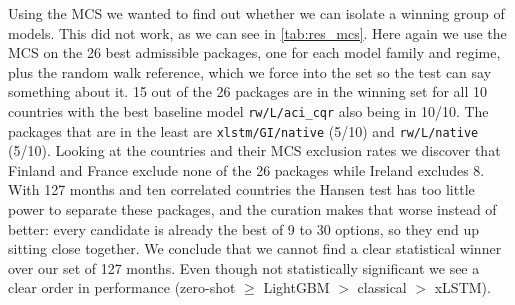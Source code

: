 Using the MCS we wanted to find out whether we can isolate a winning group of models.
This did not work, as we can see in \cref{tab:res_mcs}. Here again we use the MCS on
the 26 best admissible packages, one for each model family and regime, plus the
random walk reference, which we force into the set so the test can say something
about it. 15 out of the 26 packages are in the winning set for all 10 countries with
the best baseline model \texttt{rw/L/aci\_cqr} also being in 10/10. The packages that
are in the least are \texttt{xlstm/GI/native} (5/10) and \texttt{rw/L/native} (5/10).
Looking at the countries and their MCS exclusion rates we discover that Finland and
France exclude none of the 26 packages while Ireland excludes 8. With 127 months and
ten correlated countries the Hansen test has too little power to separate these
packages, and the curation makes that worse instead of better: every candidate is
already the best of 9 to 30 options, so they end up sitting close together. We
conclude that we cannot find a clear statistical winner over our set of 127 months.
Even though not statistically significant we see a clear order in performance
(zero-shot $\geq$ LightGBM $>$ classical $>$ xLSTM).
